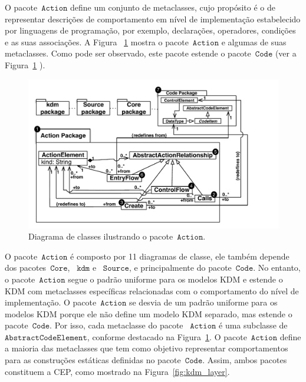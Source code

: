 O pacote~$\mathtt{Action}$ define um conjunto de metaclasses, cujo propósito é o de representar descrições de comportamento em nível de implementação estabelecido por linguagens de programação, por exemplo, declarações, operadores, condições e as suas associações. A Figura ~\ref{fig:actionModel}  mostra o pacote~$\mathtt{Action}$ e algumas de suas metaclasses. Como pode ser observado, este pacote estende o pacote~$\mathtt{Code}$ (ver a Figura~\ref {fig:actionModel} ).


\begin{figure}[!ht]
	\centering
	\includegraphics[scale=0.8]{images/ActionModel_Class_Diagram}
	\caption{Diagrama de classes ilustrando o pacote~$\mathtt{Action}$.}
	\label{fig:actionModel}
\end{figure}

O pacote~$\mathtt{Action}$ é composto por 11 diagramas de classe, ele também depende dos pacotes~$\mathtt{Core}$, ~$\mathtt{kdm}$ e ~$\mathtt{Source}$, e  principalmente do pacote~$\mathtt{Code}$. No entanto, o pacote~$\mathtt{Action}$ segue o padrão uniforme para os modelos KDM e estende o KDM com metaclasses específicas relacionadas com o comportamento do nível de implementação. O pacote~$\mathtt{Action}$ se desvia de um padrão uniforme para os modelos KDM porque ele não define um modelo KDM separado, mas estende o pacote~$\mathtt{Code}$.  Por isso, cada metaclasse do pacote ~$\mathtt{Action}$ é uma subclasse de~$\mathtt{AbstractCodeElement}$, conforme destacado na Figura~\ref{fig:actionModel}. O pacote~$\mathtt{Action}$ define a maioria das metaclasses que tem como objetivo representar comportamentos para as construções estáticas definidas no pacote~$\mathtt{Code}$. Assim, ambos pacotes constituem a CEP, como mostrado na Figura~\ref{fig:kdm_layer}.

